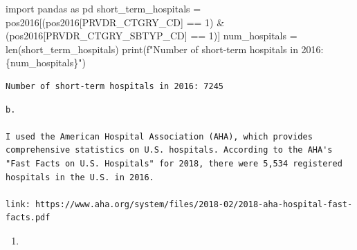 \documentclass[
  letterpaper,
  DIV=11,
  numbers=noendperiod]{scrartcl}
\newenvironment{Shaded}{\begin{snugshade}}{\end{snugshade}}
\newcommand{\BuiltInTok}[1]{\textcolor[rgb]{0.00,0.23,0.31}{#1}}
\newcommand{\DecValTok}[1]{\textcolor[rgb]{0.68,0.00,0.00}{#1}}
\newcommand{\ImportTok}[1]{\textcolor[rgb]{0.00,0.46,0.62}{#1}}
\newcommand{\NormalTok}[1]{\textcolor[rgb]{0.00,0.23,0.31}{#1}}
\newcommand{\OperatorTok}[1]{\textcolor[rgb]{0.37,0.37,0.37}{#1}}
\newcommand{\SpecialCharTok}[1]{\textcolor[rgb]{0.37,0.37,0.37}{#1}}
\newcommand{\SpecialStringTok}[1]{\textcolor[rgb]{0.13,0.47,0.30}{#1}}
\newcommand{\StringTok}[1]{\textcolor[rgb]{0.13,0.47,0.30}{#1}}
\providecommand{\tightlist}{%
  \setlength{\itemsep}{0pt}\setlength{\parskip}{0pt}}\usepackage{longtable,booktabs,array}
\begin{document}
\begin{Shaded}
\begin{Highlighting}[]
\ImportTok{import}\NormalTok{ pandas }\ImportTok{as}\NormalTok{ pd}
\NormalTok{short\_term\_hospitals }\OperatorTok{=}\NormalTok{ pos2016[(pos2016[}\StringTok{\textquotesingle{}PRVDR\_CTGRY\_CD\textquotesingle{}}\NormalTok{] }\OperatorTok{==} \DecValTok{1}\NormalTok{) }\OperatorTok{\&}\NormalTok{ (pos2016[}\StringTok{\textquotesingle{}PRVDR\_CTGRY\_SBTYP\_CD\textquotesingle{}}\NormalTok{] }\OperatorTok{==} \DecValTok{1}\NormalTok{)]}
\NormalTok{num\_hospitals }\OperatorTok{=} \BuiltInTok{len}\NormalTok{(short\_term\_hospitals)}
\BuiltInTok{print}\NormalTok{(}\SpecialStringTok{f"Number of short{-}term hospitals in 2016: }\SpecialCharTok{\{}\NormalTok{num\_hospitals}\SpecialCharTok{\}}\SpecialStringTok{"}\NormalTok{)}
\end{Highlighting}
\end{Shaded}

\begin{verbatim}
Number of short-term hospitals in 2016: 7245
\end{verbatim}

\begin{verbatim}
b.

I used the American Hospital Association (AHA), which provides comprehensive statistics on U.S. hospitals. According to the AHA's "Fast Facts on U.S. Hospitals" for 2018, there were 5,534 registered hospitals in the U.S. in 2016.

link: https://www.aha.org/system/files/2018-02/2018-aha-hospital-fast-facts.pdf
\end{verbatim}

\begin{enumerate}
\def\labelenumi{\arabic{enumi}.}
\setcounter{enumi}{2}
\tightlist
\item
\end{enumerate}
\end{document}
